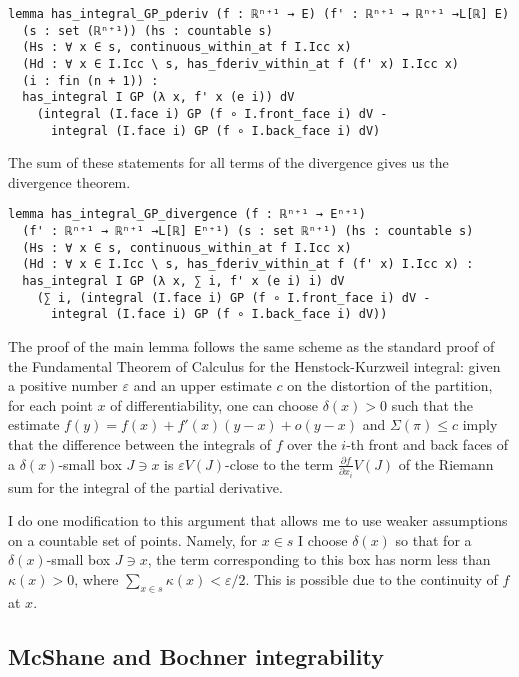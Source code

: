 \documentclass[a4paper,UKenglish,cleveref, autoref, thm-restate]{lipics-v2021}
\newcommand{\eps}{\varepsilon}
\begin{document}
\begin{lstlisting}[caption={Key lemma for the divergence theorem for the GP-integral}]
lemma has_integral_GP_pderiv (f : ℝⁿ⁺¹ → E) (f' : ℝⁿ⁺¹ → ℝⁿ⁺¹ →L[ℝ] E)
  (s : set (ℝⁿ⁺¹)) (hs : countable s)
  (Hs : ∀ x ∈ s, continuous_within_at f I.Icc x)
  (Hd : ∀ x ∈ I.Icc \ s, has_fderiv_within_at f (f' x) I.Icc x)
  (i : fin (n + 1)) :
  has_integral I GP (λ x, f' x (e i)) dV
    (integral (I.face i) GP (f ∘ I.front_face i) dV -
      integral (I.face i) GP (f ∘ I.back_face i) dV)
\end{lstlisting}

The sum of these statements for all terms of the divergence gives us
the divergence theorem.

\begin{lstlisting}[caption={The divergence theorem for the GP-integral},label=lst:divergence-GP]
lemma has_integral_GP_divergence (f : ℝⁿ⁺¹ → Eⁿ⁺¹)
  (f' : ℝⁿ⁺¹ → ℝⁿ⁺¹ →L[ℝ] Eⁿ⁺¹) (s : set ℝⁿ⁺¹) (hs : countable s)
  (Hs : ∀ x ∈ s, continuous_within_at f I.Icc x)
  (Hd : ∀ x ∈ I.Icc \ s, has_fderiv_within_at f (f' x) I.Icc x) :
  has_integral I GP (λ x, ∑ i, f' x (e i) i) dV
    (∑ i, (integral (I.face i) GP (f ∘ I.front_face i) dV -
      integral (I.face i) GP (f ∘ I.back_face i) dV))
\end{lstlisting}

The proof of the main lemma follows the same scheme as the standard
proof of the Fundamental Theorem of Calculus for the Henstock-Kurzweil
integral: given a positive number \(\eps\) and an upper estimate \(c\)
on the distortion of the partition, for each point \(x\) of
differentiability, one can choose \(\delta(x)>0\) such that the
estimate \(f(y)=f(x)+f'(x)(y-x)+o(y-x)\) and \(\Sigma(\pi)\le c\)
imply that the difference between the integrals of
\(f\) over the \(i\)-th front and back faces of a \(\delta(x)\)-small
box \(J\ni x\) is \(\eps V(J)\)-close to the term
\(\frac{\partial f}{\partial x_{i}}V(J)\) of the Riemann sum for the
integral of the partial derivative.

I do one modification to this argument that allows me to use weaker
assumptions on a countable set of points. Namely, for \(x\in s\) I
choose \(\delta(x)\) so that for a \(\delta(x)\)-small box \(J\ni x\),
the term corresponding to this box has norm less than \(\kappa(x)>0\),
where \(\sum_{x\in s}\kappa(x)<\eps/2\). This is possible due to the
continuity of \(f\) at \(x\).

\subsection{McShane and Bochner integrability}%
\label{sec:mcsh-bochn-integr}
\end{document}
